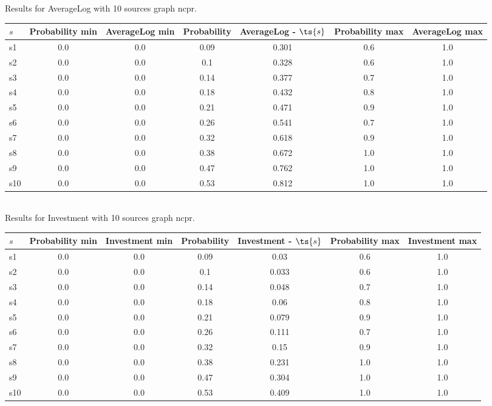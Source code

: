 \documentclass{article}
\begin{document}
\noindent Results for AverageLog with 10 sources graph ncpr.

\noindent\begin{tabular}{|l|c|c|c|c|c|c|}
\hline
$s$& Probability min & AverageLog min & Probability & AverageLog - $\ts{s}$ & Probability max & AverageLog max\\
\hline
s1 &0.0 & 0.0 & 0.09 & 0.301 & 0.6 & 1.0\\
\hline
s2 &0.0 & 0.0 & 0.1 & 0.328 & 0.6 & 1.0\\
\hline
s3 &0.0 & 0.0 & 0.14 & 0.377 & 0.7 & 1.0\\
\hline
s4 &0.0 & 0.0 & 0.18 & 0.432 & 0.8 & 1.0\\
\hline
s5 &0.0 & 0.0 & 0.21 & 0.471 & 0.9 & 1.0\\
\hline
s6 &0.0 & 0.0 & 0.26 & 0.541 & 0.7 & 1.0\\
\hline
s7 &0.0 & 0.0 & 0.32 & 0.618 & 0.9 & 1.0\\
\hline
s8 &0.0 & 0.0 & 0.38 & 0.672 & 1.0 & 1.0\\
\hline
s9 &0.0 & 0.0 & 0.47 & 0.762 & 1.0 & 1.0\\
\hline
s10 &0.0 & 0.0 & 0.53 & 0.812 & 1.0 & 1.0\\
\hline
\end{tabular}\\

\noindent Results for Investment with 10 sources graph ncpr.

\noindent\begin{tabular}{|l|c|c|c|c|c|c|}
\hline
$s$& Probability min & Investment min & Probability & Investment - $\ts{s}$ & Probability max & Investment max\\
\hline
s1 &0.0 & 0.0 & 0.09 & 0.03 & 0.6 & 1.0\\
\hline
s2 &0.0 & 0.0 & 0.1 & 0.033 & 0.6 & 1.0\\
\hline
s3 &0.0 & 0.0 & 0.14 & 0.048 & 0.7 & 1.0\\
\hline
s4 &0.0 & 0.0 & 0.18 & 0.06 & 0.8 & 1.0\\
\hline
s5 &0.0 & 0.0 & 0.21 & 0.079 & 0.9 & 1.0\\
\hline
s6 &0.0 & 0.0 & 0.26 & 0.111 & 0.7 & 1.0\\
\hline
s7 &0.0 & 0.0 & 0.32 & 0.15 & 0.9 & 1.0\\
\hline
s8 &0.0 & 0.0 & 0.38 & 0.231 & 1.0 & 1.0\\
\hline
s9 &0.0 & 0.0 & 0.47 & 0.304 & 1.0 & 1.0\\
\hline
s10 &0.0 & 0.0 & 0.53 & 0.409 & 1.0 & 1.0\\
\hline
\end{tabular}\\
\end{document}
